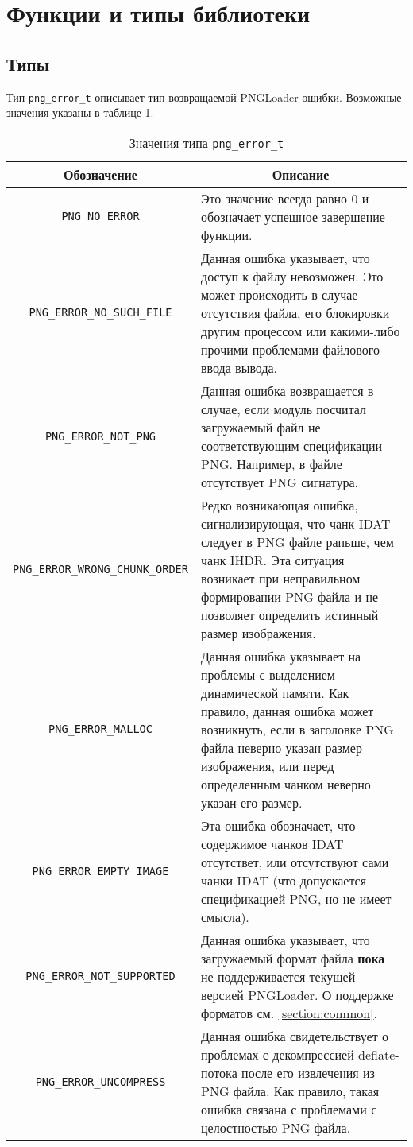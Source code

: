 \documentclass[a4paper,12pt]{article}
\begin{document}
\section{Функции и типы библиотеки}

\subsection{Типы}

Тип \texttt{png\_error\_t} описывает тип возвращаемой PNGLoader ошибки. Возможные значения указаны в таблице \ref{table:png_error_t}.

\begin{table}[!h]
  \caption{Значения типа \texttt{png\_error\_t}}
  \label{table:png_error_t}
  \begin{tabular}{|c|p{8cm}|}
    \hline
    \multicolumn{1}{|c|}{\textbf{Обозначение}} & \multicolumn{1}{|c|}{\textbf{Описание}} \\ \hline
    \texttt{PNG\_NO\_ERROR} & Это значение всегда равно 0 и обозначает успешное завершение функции. \\ \hline
    \texttt{PNG\_ERROR\_NO\_SUCH\_FILE} & Данная ошибка указывает, что доступ к файлу невозможен. Это может происходить в случае отсутствия файла, его блокировки другим процессом или какими-либо прочими проблемами файлового ввода-вывода. \\ \hline
    \texttt{PNG\_ERROR\_NOT\_PNG} & Данная ошибка возвращается в случае, если модуль посчитал загружаемый файл не соответствующим спецификации PNG. Например, в файле отсутствует PNG сигнатура. \\ \hline
    \texttt{PNG\_ERROR\_WRONG\_CHUNK\_ORDER} & Редко возникающая ошибка, сигнализирующая, что чанк IDAT следует в PNG файле раньше, чем чанк IHDR. Эта ситуация возникает при неправильном формировании PNG файла и не позволяет определить истинный размер изображения. \\ \hline
    \texttt{PNG\_ERROR\_MALLOC} & Данная ошибка указывает на проблемы с выделением динамической памяти. Как правило, данная ошибка может возникнуть, если в заголовке PNG файла неверно указан размер изображения, или перед определенным чанком неверно указан его размер. \\ \hline
    \texttt{PNG\_ERROR\_EMPTY\_IMAGE} & Эта ошибка обозначает, что содержимое чанков IDAT отсутствет, или отсутствуют сами чанки IDAT (что допускается спецификацией PNG, но не имеет смысла). \\ \hline
    \texttt{PNG\_ERROR\_NOT\_SUPPORTED} & Данная ошибка указывает, что загружаемый формат файла \textbf{пока} не поддерживается текущей версией PNGLoader. О поддержке форматов см. \ref{section:common}. \\ \hline
    \texttt{PNG\_ERROR\_UNCOMPRESS} & Данная ошибка свидетельствует о проблемах с декомпрессией deflate-потока после его извлечения из PNG файла. Как правило, такая ошибка связана с проблемами с целостностью PNG файла. \\ \hline
  \end{tabular}
\end{table}
\end{document}
